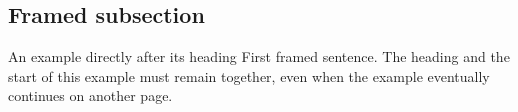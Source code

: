 \subsection{Framed subsection}
\begin{pdexample}{An example directly after its heading}
First framed sentence. The heading and the start of this example must
remain together, even when the example eventually continues on another page.
\end{pdexample}
\endinput
